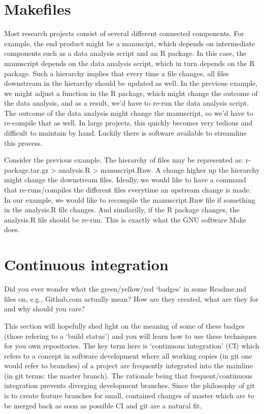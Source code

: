 \documentclass[]{book}
\begin{document}
\section{Makefiles}\label{makefiles}

Most research projects consist of several different connected
components. For example, the end product might be a manuscipt, which
depends on intermediate components such as a data analysis script and an
R package. In this case, the manuscript depends on the data analysis
script, which in turn depends on the R package. Such a hierarchy implies
that every time a file changes, all files downstream in the hierarchy
should be updated as well. In the previous example, we might adjust a
function in the R package, which might change the outcome of the data
analysis, and as a result, we'd have to re-run the data analysis script.
The outcome of the data analysis might change the manuscript, so we'd
have to re-compile that as well. In large projects, this quickly becomes
very tedious and difficult to maintain by hand. Luckily there is
software available to streamline this process.

Consider the previous example. The hierarchy of files may be represented
as: r-package.tar.gz \textgreater{} analysis.R \textgreater{}
manuscript.Rnw. A change higher up the hierarchy might change the
downstream files. Ideally, we would like to have a command that
re-runs/compiles the different files everytime an upstream change is
made. In our example, we would like to recompile the manuscript.Rnw file
if something in the analysis.R file changes. And similarilly, if the R
package changes, the analysis.R file should be re-run. This is exactly
what the GNU software Make does.

\section{Continuous integration}\label{continuous-integration-1}

Did you ever wonder what the green/yellow/red `badges' in some Readme.md
files on, e.g., Github.com actually mean? How are they created, what are
they for and why should you care?

This section will hopefully shed light on the meaning of some of these
badges (those refering to a `build status') and you will learn how to
use these techniques for you own repositories. The key term here is
`continuous integration' (CI) which refers to a concept in software
development where all working copies (in git one would refer to
branches) of a project are frequently integrated into the mainline (in
git terms: the master branch). The rationale being that
frequent/continuous integration prevents diverging development branches.
Since the philosophy of git is to create feature branches for small,
contained changes of master which are to be merged back as soon as
possible CI and git are a natural fit.
\end{document}
